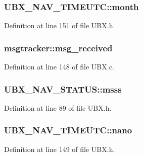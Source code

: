 \hypertarget{group___g_s_p_module_gafd4af98336281bae2375714238392070}{
\subsubsection[{month}]{ U\-B\-X\-\_\-\-N\-A\-V\-\_\-\-T\-I\-M\-E\-U\-T\-C\-::month}}\label{group___g_s_p_module_gafd4af98336281bae2375714238392070}


Definition at line 151 of file U\-B\-X.\-h.

\hypertarget{group___g_s_p_module_gac1751e91170b3bec239283bc0f0cc17a}{
\subsubsection[{msg\-\_\-received}]{ msgtracker\-::msg\-\_\-received}}\label{group___g_s_p_module_gac1751e91170b3bec239283bc0f0cc17a}


Definition at line 148 of file U\-B\-X.\-c.

\hypertarget{group___g_s_p_module_ga41de8d3154dd215b93adeebff5a7972c}{
\subsubsection[{msss}]{ U\-B\-X\-\_\-\-N\-A\-V\-\_\-\-S\-T\-A\-T\-U\-S\-::msss}}\label{group___g_s_p_module_ga41de8d3154dd215b93adeebff5a7972c}


Definition at line 89 of file U\-B\-X.\-h.

\hypertarget{group___g_s_p_module_ga2d187aede7b05688f29eacfd6bd57ecc}{
\subsubsection[{nano}]{ U\-B\-X\-\_\-\-N\-A\-V\-\_\-\-T\-I\-M\-E\-U\-T\-C\-::nano}}\label{group___g_s_p_module_ga2d187aede7b05688f29eacfd6bd57ecc}


Definition at line 149 of file U\-B\-X.\-h.

